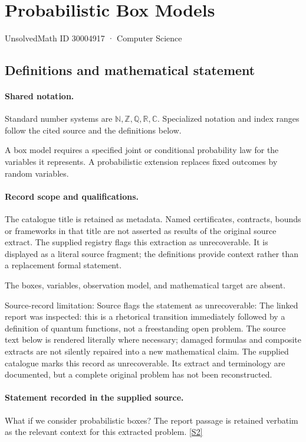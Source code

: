 \documentclass[11pt]{article}
\newcommand{\sref}[2]{\hyperlink{source:#1:#2}{[S#2]}}
\begin{document}
\setcounter{section}{30004916}
\section{Probabilistic Box Models}\label{30004917}
{\small\sffamily UnsolvedMath ID 30004917 · Computer Science}
\subsection{Definitions and mathematical statement}

\paragraph{Shared notation.}Standard number systems are $\mathbb N,\mathbb Z,\mathbb Q,\mathbb R,\mathbb C$. Specialized notation and index ranges follow the cited source and the definitions below.


A box model requires a specified joint or conditional probability law for the variables it represents. A probabilistic extension replaces fixed outcomes by random variables.
\paragraph{Record scope and qualifications.}
The catalogue title is retained as metadata. Named certificates, contracts, bounds or frameworks in that title are not asserted as results of the original source extract.
The supplied registry flags this extraction as unrecoverable. It is displayed as a literal source fragment; the definitions provide context rather than a replacement formal statement.

The boxes, variables, observation model, and mathematical target are absent.

Source-record limitation: Source flags the statement as unrecoverable: The linked report was inspected: this is a rhetorical transition immediately followed by a definition of quantum functions, not a freestanding open problem.
The source text below is rendered literally where necessary; damaged formulas and composite extracts are not silently repaired into a new mathematical claim.
The supplied catalogue marks this record as unrecoverable. Its extract and terminology are documented, but a complete original problem has not been reconstructed.
\paragraph{Statement recorded in the supplied source.}
What if we consider probabilistic boxes? The report passage is retained verbatim as the relevant context for this extracted problem. \sref{30004917}{2}
\end{document}
